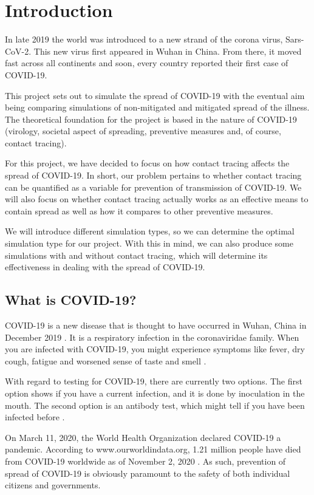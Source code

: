 \chapter{Introduction} \label{chap:introduction}

In late 2019 the world was introduced to a new strand of the corona virus, Sars-CoV-2. This new virus first appeared in Wuhan in China. From there, it moved fast across all continents and soon, every country reported their first case of COVID-19.

This project sets out to simulate the spread of COVID-19 with the eventual aim being comparing simulations of non-mitigated and mitigated spread of the illness. The theoretical foundation for the project is based in the nature of COVID-19 (virology, societal aspect of spreading, preventive measures and, of course, contact tracing).

For this project, we have decided to focus on how contact tracing affects the spread of COVID-19. In short, our problem pertains to whether contact tracing can be quantified as a variable for prevention of transmission of COVID-19. We will also focus on whether contact tracing actually works as an effective means to contain spread as well as how it compares to other preventive measures. 

We will introduce different simulation types, so we can determine the optimal simulation type for our project. With this in mind, we can also produce some simulations with and without contact tracing, which will determine its effectiveness in dealing with the spread of COVID-19.

\section{What is COVID-19?}
COVID-19 is a new disease that is thought to have occurred in Wuhan, China in December 2019 \citep{gorbalenya_severe_2020}. It is a respiratory infection in the coronaviridae family. When you are infected with COVID-19, you might experience symptoms like fever, dry cough, fatigue and worsened sense of taste and smell \citep{ssi_statens_nodate}.

With regard to testing for COVID-19, there are currently two options. The first option shows if you have a current infection, and it is done by inoculation in the mouth. The second option is an antibody test, which might tell if you have been infected before \citep{cdc_coronavirus_2020}.

On March 11, 2020, the World Health Organization declared COVID-19 a pandemic. According to www.ourworldindata.org, 1.21 million people have died from COVID-19 worldwide as of November 2, 2020 \citep{ritchie_coronavirus_2020}. As such, prevention of spread of COVID-19 is obviously paramount to the safety of both individual citizens and governments.

